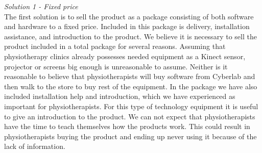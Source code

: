 \emph{Solution 1 - Fixed price}\\ 
The first solution is to sell the product as a package consisting of both software and hardware to a fixed price. Included in this package is delivery, installation assistance, and introduction to the product. We believe it is necessary  to sell the product included in a total package for several reasons. Assuming that physiotherapy clinics already possesses needed equipment as a Kinect sensor, projector or screens big enough is unreasonable to assume. Neither is it reasonable to believe that physiotherapists will buy software from Cyberlab and then walk to the store to buy rest of the equipment. In the package we have also included installation help and introduction, which we have experienced as important for physiotherapists. For this type of technology equipment it is useful to give an introduction to the product. We can not expect that physiotherapists have the time to teach themselves how the products work. This could result in physiotherapists buying the product and ending up never using it because of the lack of information. \\ \\
